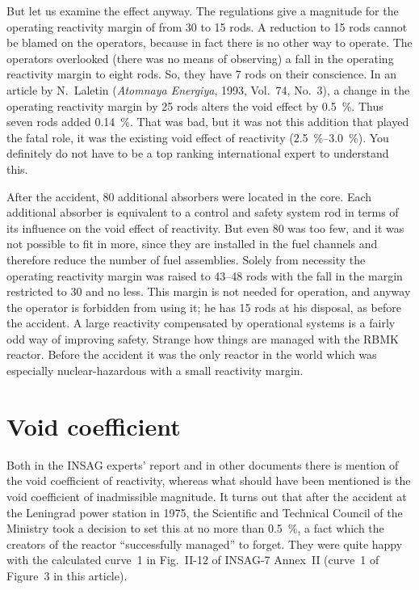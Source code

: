 \documentclass[openright]{bookest}
\begin{document}
But let us examine the effect anyway. The regulations give a magnitude for the operating reactivity margin of from 30 to 15 rods. A reduction to 15 rods cannot be blamed on the operators, because in fact there is no other way to operate. The operators overlooked (there was no means of observing) a fall in the operating reactivity margin to eight rods. So, they have 7 rods on their conscience. In an article by N.~Laletin (\textit{Atomnaya Energiya}, 1993, Vol.~74, No.~3), a change in the operating reactivity margin by 25 rods alters the void effect by \qty{0.5}{\percent}. Thus seven rods added \qty{0.14}{\percent}. That was bad, but it was not this addition that played the fatal role, it was the existing void effect of reactivity (\qtyrange{2.5}{3.0}{\percent}). You definitely do not have to be a top ranking international expert to understand this.

After the accident, 80 additional absorbers were located in the core. Each additional absorber is equivalent to a control and safety system rod in terms of its influence on the void effect of reactivity. But even 80 was too few, and it was not possible to fit in more, since they are installed in the fuel channels and therefore reduce the number of fuel assemblies. Solely from necessity the operating reactivity margin was raised to \numrange{43}{48} rods with the fall in the margin restricted to 30 and no less. This margin is not needed for operation, and anyway the operator is forbidden from using it; he has 15 rods at his disposal, as before the accident. A large reactivity compensated by operational systems is a fairly odd way of improving safety. Strange how things are managed with the RBMK reactor. Before the accident it was the only reactor in the world which was especially nuclear-hazardous with a small reactivity margin.

\section*{Void coefficient}

Both in the INSAG experts' report and in other documents there is mention of the void coefficient of reactivity, whereas what should have been mentioned is the void coefficient of inadmissible magnitude. It turns out that after the accident at the Leningrad power station in 1975, the Scientific and Technical Council of the Ministry took a decision to set this at no more than \qty{0.5}{\percent}, a fact which the creators of the reactor ``successfully managed'' to forget. They were quite happy with the calculated curve~1 in Fig.~II-12 of INSAG-7 Annex~II (curve~1 of Figure~3 in this article).
\end{document}
